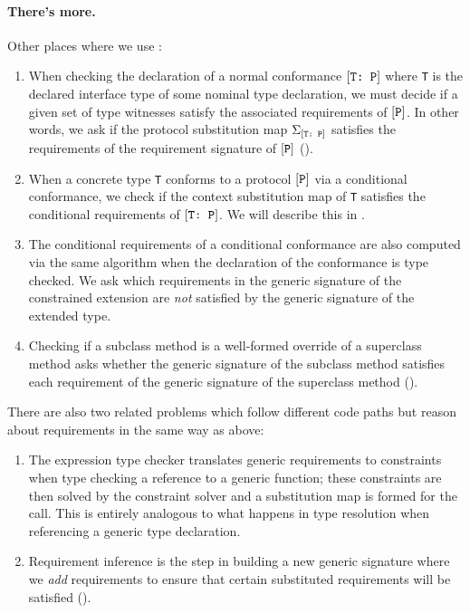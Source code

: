 \documentclass[../generics]{subfiles}
\begin{document}
\paragraph{There's more.} Other places where we use :
\begin{enumerate}
\item When checking the declaration of a normal conformance $[\texttt{T:~P}]$ where \texttt{T} is the declared interface type of some nominal type declaration, we must decide if a given set of type witnesses satisfy the associated requirements of $[\texttt{P}]$. In other words, we ask if the protocol substitution map $\Sigma_{[\texttt{T:~P}]}$ satisfies the requirements of the requirement signature of $[\texttt{P}]$ ().

\item When a concrete type \texttt{T} conforms to a protocol $[\texttt{P}]$ via a conditional conformance, we check if the context substitution map of \texttt{T} satisfies the conditional requirements of $[\texttt{T:~P}]$. We will describe this in .

\item The conditional requirements of a conditional conformance are also computed via the same algorithm when the declaration of the conformance is type checked. We ask which requirements in the generic signature of the constrained extension are \emph{not} satisfied by the generic signature of the extended type.

\item Checking if a subclass method is a well-formed override of a superclass method asks whether the generic signature of the subclass method satisfies each requirement of the generic signature of the superclass method ().
\end{enumerate}
There are also two related problems which follow different code paths but reason about requirements in the same way as above:
\begin{enumerate}
\item The expression type checker translates generic requirements to constraints when type checking a reference to a generic function; these constraints are then solved by the constraint solver and a substitution map is formed for the call. This is entirely analogous to what happens in type resolution when referencing a generic type declaration.

\item Requirement inference is the step in building a new generic signature where we \emph{add} requirements to ensure that certain substituted requirements will be satisfied ().
\end{enumerate}
\end{document}
